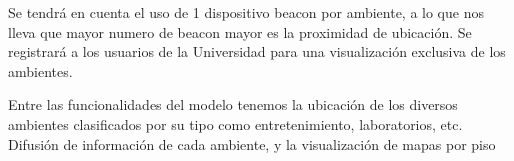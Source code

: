 \documentclass[12pt]{article}
\begin{document}
Se tendrá en cuenta el uso de 1 dispositivo beacon por ambiente, a lo que nos lleva que mayor numero de beacon mayor es la proximidad de ubicación. Se registrará a los usuarios de la Universidad para una visualización exclusiva de los ambientes.

Entre las funcionalidades del modelo tenemos la ubicación de los diversos ambientes clasificados por su tipo como entretenimiento, laboratorios, etc. Difusión de información de cada ambiente, y la visualización de mapas por piso
\end{document}
